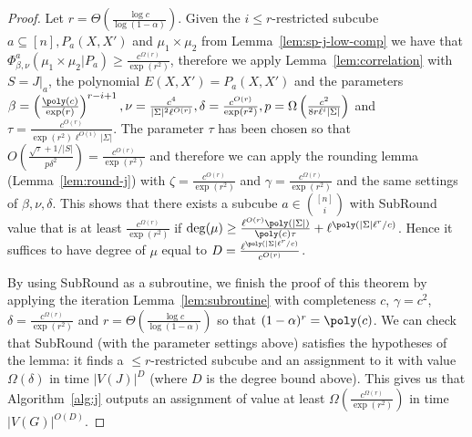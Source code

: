 \begin{proof}
Let $r = \Theta(\frac{\log c}{\log(1-\alpha)})$. Given the $i \leq r$-restricted subcube $a \subseteq [n], P_a(X,X')$ and $\mu_1 \times \mu_2$ from Lemma~\ref{lem:sp-j-low-comp} we have that $\Phi_{\beta,\nu}^a(\mu_1 \times \mu_2| P_a) \geq \frac{c^{\Omega(r)}}{\exp(r^2)}$, therefore we apply Lemma~\ref{lem:correlation} with $S = J|_a$, the polynomial  $E(X,X') = P_a(X,X')$ and the parameters $\beta = \left(\frac{\poly(c)}{\exp(r)}\right)^{r-i+1}, \nu = \frac{c^4}{|\Sigma|^2\ell^{O(r)}}, \delta = \frac{c^{O(r)}}{\exp(r^2)}, p = \Omega\left(\frac{c^2}{8r\ell^i|\Sigma|}\right)$ and $\tau = \frac{c^{O(r)}}{\exp(r^2)\ell^{O(i)}|\Sigma|}$. The parameter $\tau$ has been chosen so that $O(\frac{\sqrt{\tau}+1/|S|}{p\delta^2}) = \frac{c^{O(r)}}{\exp(r^2)}$ and therefore we can apply the rounding lemma (Lemma~\ref{lem:round-j}) with $\zeta = \frac{c^{O(r)}}{\exp(r^2)}$ and $\gamma = \frac{c^{\Omega(r)}}{\exp(r^2)}$ and the same settings of $\beta, \nu, \delta$. This shows that there exists a subcube $a \in {[n] \choose i}$ with SubRound value that is at least $\frac{c^{\Omega(r)}}{\exp(r^2)}$ if $\deg(\mu) \geq  \frac{\ell^{O(r)}\poly(|\Sigma|)}{\poly(c)\tau}+ \ell^{\poly(|\Sigma|\ell^r/c)}$. Hence it suffices to have degree of $\mu$ equal to $D = \frac{\ell^{\poly(|\Sigma|\ell^r/c)}}{c^{O(r)}}$.

By using SubRound as a subroutine, we finish the proof of this theorem by applying the iteration Lemma~\ref{lem:subroutine} with completeness $c$, $\gamma = c^2$, $\delta = \frac{c^{\Omega(r)}}{\exp(r^2)}$ and $r = \Theta(\frac{\log c}{\log(1-\alpha)})$ so that $(1-\alpha)^r = \poly(c)$. We can check that SubRound (with the parameter settings above) satisfies the hypotheses of the lemma: it finds a $\le r$-restricted subcube and an assignment to it with value $\Omega(\delta)$ in time $|V(J)|^{D}$ (where $D$ is the degree bound above). This gives us that Algorithm~\ref{alg:j} outputs an assignment of value at least $\Omega\left(\frac{c^{\Omega(r)}}{\exp(r^2)}\right)$ in time $|V(G)|^{O(D)}$.
\end{proof}






















